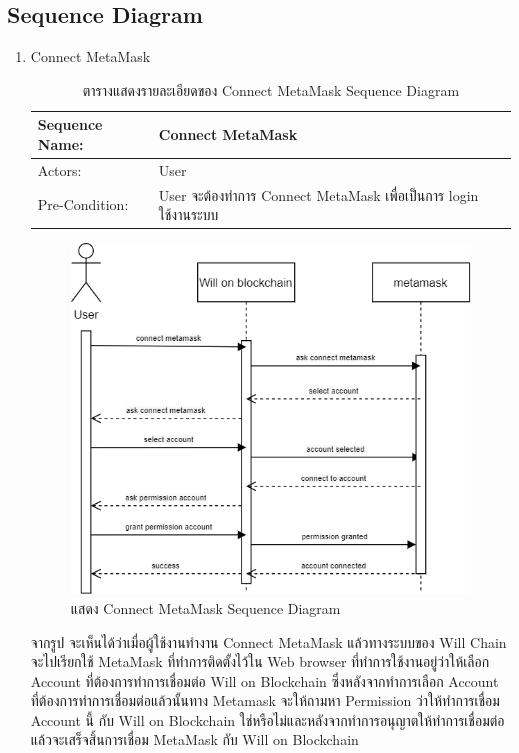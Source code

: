 \documentclass[12pt,oneside,openright,a4paper]{cpe-thai-project}
\begin{document}
\subsection{Sequence Diagram}
	\begin{enumerate}[label=\thesubsection.\arabic*,leftmargin=0pt,itemindent=1.25cm]
	\item Connect MetaMask
		\begin{table}[h]
		\centering
		\caption{ตารางแสดงรายละเอียดของ Connect MetaMask Sequence Diagram}
		\begin{tabularx}{\textwidth}{|l|X|X|} 
			\hline
			Sequence Name: & Connect MetaMask                                                 \\ 
			\hline
			Actors:        & User                                                             \\ 
			\hline
			Pre-Condition: & User จะต้องทำการ Connect MetaMask เพื่อเป็นการ login ใช้งานระบบ  \\
			\hline
		\end{tabularx}
		\end{table}
		\begin{figure}[!thb]
			\centering
			\includegraphics[scale=0.6]{connectMetamaskSeq}
			\caption{แสดง Connect MetaMask Sequence Diagram}
		\end{figure}
		\FloatBarrier
	\tab จากรูป จะเห็นได้ว่าเมื่อผู้ใช้งานทํางาน Connect MetaMask แล้วทางระบบของ Will Chain จะไปเรียกใช้ MetaMask ที่ทําการติดตั้งไว้ใน Web browser ที่ทําการใช้งานอยู่ว่าให้เลือก Account ที่ต้องการทําการเชื่อมต่อ Will on Blockchain ซึ่งหลังจากทําการเลือก Account ที่ต้องการทําการเชื่อมต่อแล้วนั้นทาง Metamask จะให้ถามหา Permission ว่าให้ทําการเชื่อม Account นี้ กับ Will on Blockchain ใช่หรือไม่และหลังจากทําการอนุญาตให้ทําการเชื่อมต่อแล้วจะเสร็จสิ้นการเชื่อม MetaMask กับ Will on Blockchain

\end{enumerate}
\end{document}
